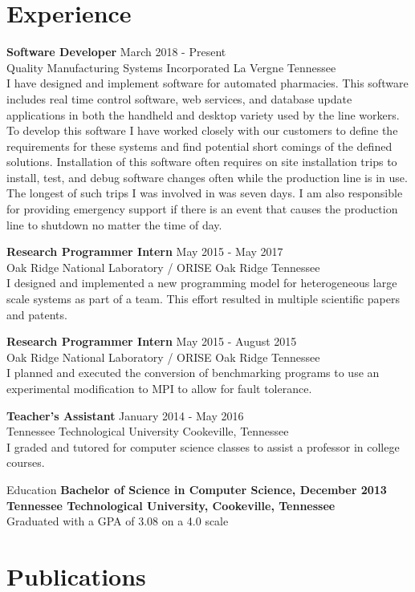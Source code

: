 \documentclass{res} \usepackage{tabularx} \usepackage{changepage}
\newcommand{\job}[5]{ 
{\bf #1} \hfill #2 \\ 
#3 \hfill #4\\ 
#5
}
\begin{document}
\begin{resume}
\section{Experience}
\job{Software Developer} 
{March 2018 - Present} 
{Quality Manufacturing Systems Incorporated}
{La Vergne Tennessee}
{
    I have designed and implement software for automated pharmacies. This
    software includes real time  control software, web services, and database
    update applications in both the handheld and desktop variety  used by the
    line workers.  To develop this software I have worked closely with our
    customers to define the requirements for these
    systems and find potential short comings of the defined solutions.
    Installation of this software often requires on site
    installation trips to install, test, and debug software
    changes often while the production line is in use. The longest of such
    trips I was involved in was seven days. I am also responsible
    for providing emergency support if there is an event that causes the
    production line to shutdown no matter the time of day.
}

\job{Research Programmer Intern} 
{May 2015 - May 2017} 
{Oak Ridge National Laboratory / ORISE} 
{Oak Ridge Tennessee}
{
    I designed and implemented a new programming model for heterogeneous large scale systems as part of a team.
    This effort resulted in multiple scientific papers and patents.
}

\job{Research Programmer Intern} 
{May 2015 - August 2015}
{Oak Ridge National Laboratory / ORISE}
{Oak Ridge Tennessee}
{
    I planned and executed the conversion of benchmarking 
    programs to use an experimental
    modification to MPI to allow for fault tolerance.
}

\job{Teacher's Assistant} {January 2014 - May 2016}
{Tennessee Technological University}
{Cookeville, Tennessee}
{
    I graded and tutored for computer science classes to assist a 
    professor in college courses.
}

\begin{section}{Education}
    {\bf Bachelor of Science in Computer Science, December 2013\\
    Tennessee Technological University, Cookeville, Tennessee}\\
    Graduated with a GPA of 3.08 on a 4.0 scale
\end{section}

\newpage
\section{Publications}


\end{resume}
\end{document}
